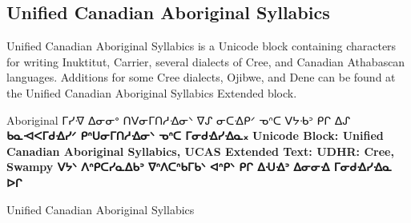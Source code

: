 \subsection{Unified Canadian Aboriginal Syllabics}

Unified Canadian Aboriginal Syllabics is a Unicode block containing characters for writing Inuktitut, Carrier, several dialects of Cree, and Canadian Athabascan languages. Additions for some Cree dialects, Ojibwe, and Dene can be found at the Unified Canadian Aboriginal Syllabics Extended block.
\medskip

\newfontfamily{}

\begin{scriptexample}[]{Aboriginal}
\bgroup
\aboriginal
ᒥᓯᐌ ᐃᓂᓂᐤ ᑎᐯᓂᒥᑎᓱᐎᓂᐠ ᐁᔑ ᓂᑕᐎᑭᐟ ᓀᐢᑕ ᐯᔭᑾᐣ ᑭᒋ ᐃᔑ
\bfseries ᑲᓇᐗᐸᒥᑯᐎᓯᐟ ᑭᐢᑌᓂᒥᑎᓱᐎᓂᐠ ᓀᐢᑕ ᒥᓂᑯᐎᓯᐎᓇ᙮
Unicode Block: Unified Canadian Aboriginal Syllabics, UCAS Extended
Text: UDHR: Cree, Swampy ᐯᔭᐠ ᐱᐢᑭᑕᓯᓇᐃᑲᐣ ᐁᐢᐱᑕᐢᑲᒥᑲᐠ ᐊᐢᑭᐠ ᑭᒋ ᐃᑗᐎᐣ ᐃᓂᓂᐎ ᒥᓂᑯᐎᓯᐎᓇ ᐅᒋ
\egroup
\end{scriptexample}

\begin{scriptexample}[]{Unified Canadian Aboriginal Syllabics }
\end{scriptexample}